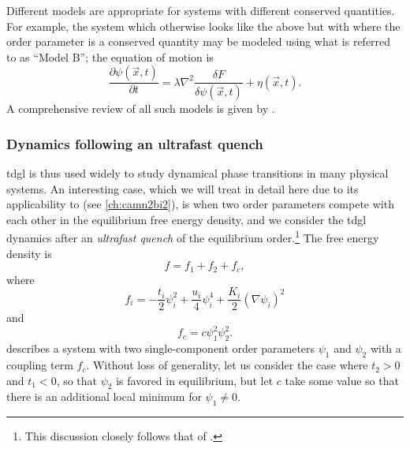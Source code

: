 Different models are appropriate for systems with different conserved quantities.
For example, the system which otherwise looks like the above but with where the order parameter is a conserved quantity may be modeled using what is referred to as ``Model B''\citep{kawasaki_diffusion_1966}; the equation of motion is
\begin{equation}\label{eq:modelbequation}
\frac{\partial\psi(\vec{x}, t)}{\partial t} = \lambda \nabla^2\frac{\delta F}{\delta \psi(\vec{x}, t)}+\eta(\vec{x}, t).
\end{equation}
A comprehensive review of all such models is given by \citet{hohenberg_theory_1977}.

\subsubsection{Dynamics following an ultrafast quench}\label{sec:sunandmillis}

\Gls{tdgl} is thus used widely to study dynamical phase transitions in many physical systems.
An interesting case, which we will treat in detail here due to its applicability to  (see \cref{ch:camn2bi2}), is when two order parameters compete with each other in the equilibrium free energy density, and we consider the \gls{tdgl} dynamics after an \emph{ultrafast quench} of the equilibrium order.\footnote{This discussion closely follows that of \citet{sun_transient_2020}.}
The free energy density is
\begin{equation}\label{eq:coupledfreeeneergydensity}
f = f_1+f_2+f_c,
\end{equation}
where
\begin{equation}
f_i = -\frac{t_i}{2} \psi_i^2+\frac{u_i}{4}\psi_i^4+\frac{K_i}{2}(\nabla\psi_i)^2
\end{equation}
and
\begin{equation}
f_c = c\psi_1^2\psi_2^2.
\end{equation}
 describes a system with two single-component order parameters $\psi_1$ and $\psi_2$ with a coupling term $f_c$.
Without loss of generality, let us consider the case where $t_2>0$ and $t_1<0$, so that $\psi_2$ is favored in equilibrium, but let $c$ take some value so that there is an additional local minimum for $\psi_1\neq0$.

